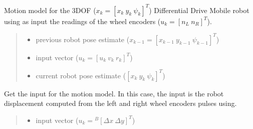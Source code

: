 \documentclass[letterpaper,10pt,english]{sphinxmanual}
\begin{document}
\begin{fulllineitems}
\begin{fulllineitems}
\label{\detokenize{DRLocalization:DR_3DOFDifferentialDrive.DR_3DOFDifferentialDrive.Localize}}
\pysigstartsignatures
{}
\pysigstopsignatures
\sphinxAtStartPar
Motion model for the 3DOF (\(x_k=[x_{k}~y_{k}~\psi_{k}]^T\)) Differential Drive Mobile robot using as input the readings of the wheel encoders (\(u_k=[n_L~n_R]^T\)).
\begin{quote}\begin{description}
\begin{itemize}
\item {} 
\sphinxAtStartPar
{} \textendash{} previous robot pose estimate (\(x_{k-1}=[x_{k-1}~y_{k-1}~\psi_{k-1}]^T\))

\item {} 
\sphinxAtStartPar
{} \textendash{} input vector (\(u_k=[u_{k}~v_{k}~r_{k}]^T\))

\end{itemize}

\sphinxAtStartPar
\begin{itemize}
\item {} 
\sphinxAtStartPar
{} current robot pose estimate (\([x_{k}~y_{k}~\psi_{k}]^T\))

\end{itemize}


\end{description}\end{quote}

\end{fulllineitems}


\begin{fulllineitems}
\label{\detokenize{DRLocalization:DR_3DOFDifferentialDrive.DR_3DOFDifferentialDrive.GetInput}}
\pysigstartsignatures
{}
\pysigstopsignatures
\sphinxAtStartPar
Get the input for the motion model. In this case, the input is the robot displacement computed from the left and
right wheel encoders pulses using.
\begin{quote}\begin{description}
\sphinxAtStartPar
\begin{itemize}
\item {} 
\sphinxAtStartPar
{}  input vector (\(u_k={}^B[\Delta x~\Delta y]^T\))


\end{itemize}
\end{description}
\end{quote}
\end{fulllineitems}
\end{fulllineitems}
\end{document}
